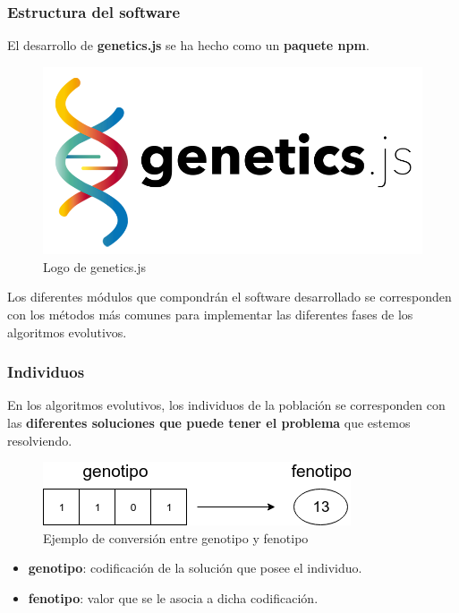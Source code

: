 \documentclass{beamer}
\begin{document}
\begin{frame}
\frametitle{Estructura del software}

El desarrollo de \textbf{genetics.js} se ha hecho como un \textbf{paquete npm}.

\begin{figure}
    \centering
    \includegraphics[scale=0.2]{pres/img/geneticsjs-logo.png}
    \caption{Logo de genetics.js}
    \label{fig:my_label}
\end{figure}

Los diferentes módulos que compondrán el software desarrollado se corresponden con los métodos más comunes para implementar las diferentes fases de los algoritmos evolutivos. 

\end{frame}

\begin{frame}
\frametitle{Individuos}

En los algoritmos evolutivos, los individuos de la población se corresponden con las \textbf{diferentes soluciones que puede tener el problema} que estemos resolviendo.

\begin{figure}
    \centering
    \includegraphics[scale=0.6]{mem/images/cap-4/4.2.2(Individuos)/Individuos-1.png}
    \caption{Ejemplo de conversión entre genotipo y fenotipo}
    \label{fig:ejemplo-1}
\end{figure}

\begin{itemize}
    \item \textbf{genotipo}: codificación de la solución que posee el individuo.
    \item \textbf{fenotipo}: valor que se le asocia a dicha codificación.
\end{itemize}

\end{frame}
\end{document}
